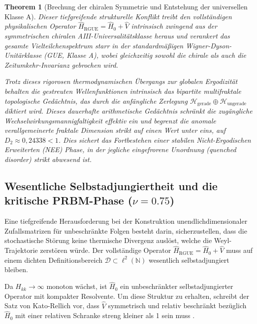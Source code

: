 \documentclass[aps,prl,preprint,superscriptaddress,floatfix]{revtex4-2}
\newtheorem{theorem}{Theorem}[section]
\newcommand{\N}{\mathbb{N}}
\newcommand{\Hilb}{\mathcal{H}}
\begin{document}
\begin{theorem}[Brechung der chiralen Symmetrie und Entstehung der universellen Klasse A]
Dieser tiefgreifende strukturelle Konflikt treibt den vollständigen physikalischen Operator $\hat{H}_{\text{RGUE}} = \hat{H}_0 + \hat{V}$ intrinsisch zwingend aus der symmetrischen chiralen AIII-Universalitätsklasse heraus und verankert das gesamte Vielteilchenspektrum starr in der standardmäßigen Wigner-Dyson-Unitärklasse (GUE, Klasse A), wobei gleichzeitig sowohl die chirale als auch die Zeitumkehr-Invarianz gebrochen wird.

Trotz dieses rigorosen thermodynamischen Übergangs zur globalen Ergodizität behalten die gestreuten Wellenfunktionen intrinsisch das bipartite multifraktale topologische Gedächtnis, das durch die anfängliche Zerlegung $\Hilb_{\text{gerade}} \oplus \Hilb_{\text{ungerade}}$ diktiert wird. Dieses dauerhafte arithmetische Gedächtnis schränkt die zugängliche Wechselwirkungsmannigfaltigkeit effektiv ein und begrenzt die anomale verallgemeinerte fraktale Dimension strikt auf einen Wert unter eins, auf $D_2 \approx 0,24338 < 1$. Dies sichert das Fortbestehen einer stabilen Nicht-Ergodischen Erweiterten (NEE) Phase, in der jegliche eingefrorene Unordnung (\textit{quenched disorder}) strikt abwesend ist.
\end{theorem}

\subsection{Wesentliche Selbstadjungiertheit und die kritische PRBM-Phase (\texorpdfstring{$\nu = 0.75$}{nu = 0.75})}

Eine tiefgreifende Herausforderung bei der Konstruktion unendlichdimensionaler Zufallsmatrizen für unbeschränkte Folgen besteht darin, sicherzustellen, dass die stochastische Störung keine thermische Divergenz auslöst, welche die Weyl-Trajektorie zerstören würde. Der vollständige Operator $\hat{H}_{\text{RGUE}} = \hat{H}_0 + \hat{V}$ muss auf einem dichten Definitionsbereich $\mathcal{D} \subset \ell^2(\N)$ wesentlich selbstadjungiert bleiben.

Da $H_{kk} \to \infty$ monoton wächst, ist $\hat{H}_0$ ein unbeschränkter selbstadjungierter Operator mit kompakter Resolvente. Um diese Struktur zu erhalten, schreibt der Satz von Kato-Rellich vor, dass $\hat{V}$ symmetrisch und relativ beschränkt bezüglich $\hat{H}_0$ mit einer relativen Schranke streng kleiner als 1 sein muss \cite{ReedSimon1975}. 
\end{document}
